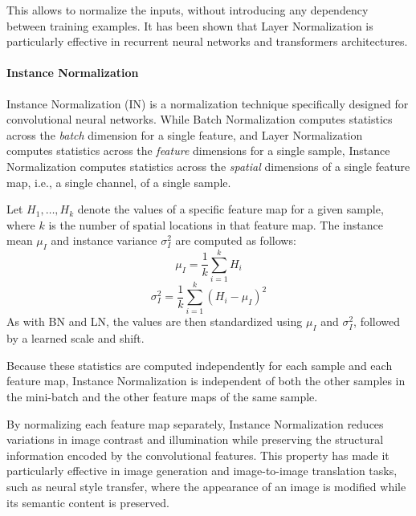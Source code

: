 This allows to normalize the inputs, without introducing any dependency between training examples.
It has been shown that Layer Normalization is particularly effective in recurrent neural networks and transformers architectures.


\paragraph{Instance Normalization}
Instance Normalization (IN) is a normalization technique specifically designed for convolutional neural networks. While Batch Normalization computes statistics across the \textit{batch} dimension for a single feature, and Layer Normalization computes statistics across the \textit{feature} dimensions for a single sample, Instance Normalization computes statistics across the \textit{spatial} dimensions of a single feature map, i.e., a single channel, of a single sample.

Let $H_1, \ldots, H_k$ denote the values of a specific feature map for a given sample, where $k$ is the number of spatial locations in that feature map. The instance mean $\mu_I$ and instance variance $\sigma_I^2$ are computed as follows:
\begin{equation*}
    \mu_I = \frac{1}{k} \sum_{i=1}^{k} H_i
\end{equation*}
\begin{equation*}
    \sigma_I^2 = \frac{1}{k} \sum_{i=1}^{k} (H_i - \mu_I)^2
\end{equation*}
As with BN and LN, the values are then standardized using $\mu_I$ and $\sigma_I^2$, followed by a learned scale and shift.

Because these statistics are computed independently for each sample and each feature map, Instance Normalization is independent of both the other samples in the mini-batch and the other feature maps of the same sample.

By normalizing each feature map separately, Instance Normalization reduces variations in image contrast and illumination while preserving the structural information encoded by the convolutional features. This property has made it particularly effective in image generation and image-to-image translation tasks, such as neural style transfer, where the appearance of an image is modified while its semantic content is preserved.

